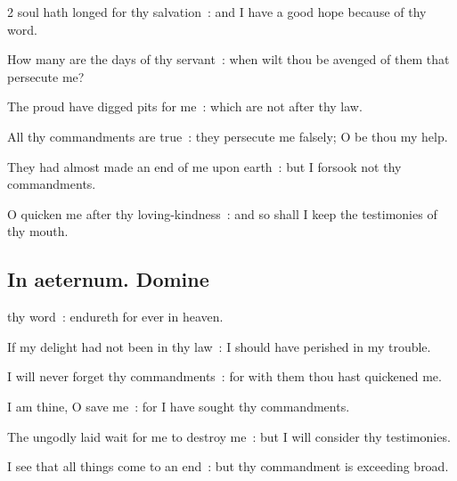 \begin{multicols}{2}
 soul hath longed for thy salvation~: and I have a good hope because of thy word.\par
{}
How many are the days of thy servant~: when wilt thou be avenged of them that persecute me?\par
{}The proud have digged pits for me~: which are not after thy law.\par
{}All thy commandments are true~: they persecute me falsely; O be thou my help.\par
{}They had almost made an end of me upon earth~: but I forsook not thy commandments.\par
{}O quicken me after thy loving-kindness~: and so shall I keep the testimonies of thy mouth.\par


\subsection{In aeternum. Domine}


 thy word~: endureth for ever in heaven.\par
{}
If my delight had not been in thy law~: I should have perished in my trouble.\par
{}I will never forget thy commandments~: for with them thou hast quickened me.\par
{}I am thine, O save me~: for I have sought thy commandments.\par
{}The ungodly laid wait for me to destroy me~: but I will consider thy testimonies.\par
{}I see that all things come to an end~: but thy commandment is exceeding broad.\par


\end{multicols}
